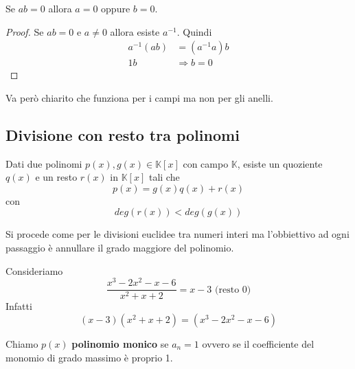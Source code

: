 \begin{theorem}
	Se $ab = 0$ allora $a = 0$ oppure $b = 0$.
	\begin{proof}
		Se $ab = 0$ e $a \neq 0$ allora esiste $a^{-1}$. Quindi
		\begin{equation*}
			\begin{array}{ll}
				a^{-1}(ab) & = (a^{-1}a)b      \\
				1b         & \Rightarrow b = 0
			\end{array}
		\end{equation*}
	\end{proof}
	Va per\`o chiarito che funziona per i campi ma non per gli anelli.
\end{theorem}

\subsection{Divisione con resto tra polinomi}

\begin{theorem}
	Dati due polinomi $p(x), g(x) \in \mathbb{K}[x]$ con campo $\mathbb{K}$, esiste un
	quoziente $q(x)$ e un resto $r(x)$ in $\mathbb{K}[x]$ tali che
	\begin{equation*}
		p(x) = g(x) q(x) + r(x)
	\end{equation*}
	con
	\begin{equation*}
		deg(r(x)) < deg(g(x))
	\end{equation*}
\end{theorem}

Si procede come per le divisioni euclidee tra numeri interi ma l'obbiettivo ad ogni passaggio
\`e annullare il grado maggiore del polinomio.

\begin{example}
	Consideriamo
	\begin{equation*}
		\frac{x^3 - 2x^2 - x -6}{x^2 + x + 2} = x - 3 \text{ (resto 0)}
	\end{equation*}
	Infatti
	\begin{equation*}
		(x - 3)(x^2 + x + 2) = (x^3 - 2x^2 - x - 6)
	\end{equation*}
\end{example}

\begin{defn}
	Chiamo $p(x)$ \textbf{polinomio monico} se $a_n = 1$ ovvero se il coefficiente del monomio
	di grado massimo \`e proprio 1.
\end{defn}

